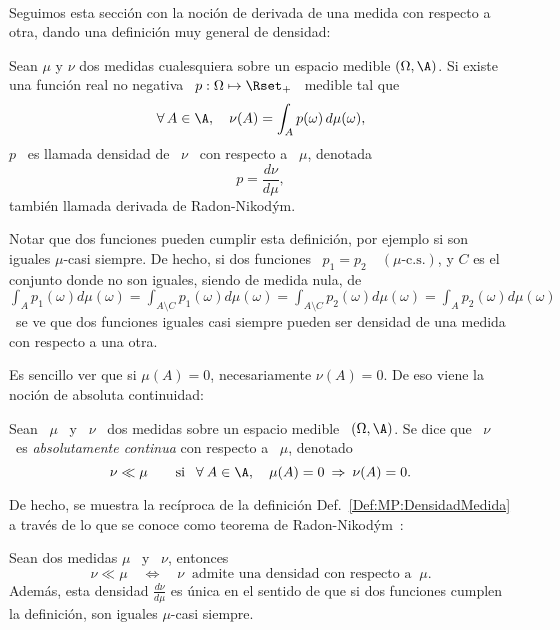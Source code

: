 \

Seguimos esta secci\'on con la noci\'on de derivada de una medida con respecto a
otra, dando una definici\'on muy general de densidad:
%
\begin{definicion}
\label{Def:MP:DensidadMedida}
%
  Sean  $\mu$  y  $\nu$  dos  medidas  cualesquiera  sobre  un  espacio  medible
  $(\Omega,\A)$.  Si existe una funci\'on  real no negativa \ $p: \Omega \mapsto
  \Rset_+$ \ medible tal que
  \[
  \forall \, A \in \A, \quad \nu(A) = \int_A p(\omega) \, d\mu(\omega),
  \]
  $p$ \ es llamada densidad de \ $\nu$ \ con respecto a \ $\mu$, denotada
  \[
  p = \frac{d\nu}{d\mu},
  \]
  tambi\'en llamada derivada de Radon-Nikod\'ym.
\end{definicion}

Notar que  dos funciones  pueden cumplir esta  definici\'on, por ejemplo  si son
iguales  $\mu$-casi siempre.   De hecho,  si dos  funciones \  $p_1 =  p_2 \quad
(\mu\mbox{-c.s.})$, y $C$ es el conjunto  donde no son iguales, siendo de medida
nula, de \ $\displaystyle  \int_A p_1(\omega) d\mu(\omega) = \int_{A\setminus C}
p_1(\omega) d\mu(\omega) = \int_{A\setminus C} p_2(\omega) d\mu(\omega) = \int_A
p_2(\omega) d\mu(\omega)$ \ se ve  que dos funciones iguales casi siempre pueden
ser densidad de una medida con respecto a una otra.

Es sencillo ver que  si $\mu(A) = 0$, necesariamente $\nu(A) =  0$. De eso viene
la noci\'on de absoluta continuidad:
%
\begin{definicion}
\label{Def:MP:AbsolutaContinuidad}
%
  Sean  \  $\mu$  \  y  \  $\nu$  \ dos  medidas  sobre  un  espacio  medible  \
  $(\Omega,\A)$.   Se dice que  \ $\nu$  \ es  {\it absolutamente  continua} con
  respecto a \ $\mu$, denotado
  \[
  \nu \ll \mu \qquad  \mbox{si } \:\: \forall \: A \in \A,  \quad \mu(A) = 0 \:
  \Rightarrow \: \nu(A) = 0.
  \]
\end{definicion}
%
De    hecho,     se    muestra    la    rec\'iproca     de    la    definici\'on
Def.~\ref{Def:MP:DensidadMedida} a trav\'es de lo  que se conoce como teorema de
Radon-Nikod\'ym~\cite{Nik30, AshDol99, AthLah06, Bog07:v1, Coh13}:
%
\begin{teorema}
\label{Teo:MP:RadonNikodym}
%
  Sean dos medidas $\mu$ \ y \ $\nu$, entonces
  \[
  \nu \ll \mu \quad \Longleftrightarrow  \quad \nu \: \mbox{ admite una densidad
    con respecto a } \: \mu.
  \]
  Adem\'as, esta densidad $\frac{d\nu}{d\mu}$ es \'unica en el sentido de que si
  dos funciones cumplen la definici\'on, son iguales $\mu$-casi siempre.
\end{teorema}

